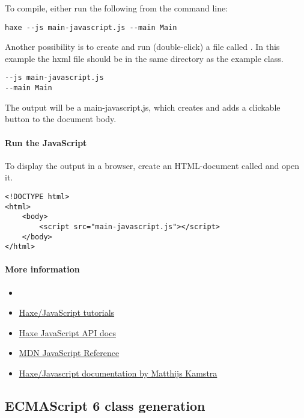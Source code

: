 To compile, either run the following from the command line:

\begin{lstlisting}
haxe --js main-javascript.js --main Main
\end{lstlisting}

Another possibility is to create and run (double-click) a file called . In this example the hxml file should be in the same directory as the example class.

\begin{lstlisting}
--js main-javascript.js
--main Main
\end{lstlisting}

The output will be a main-javascript.js, which creates and adds a clickable button to the document body.

\paragraph{Run the JavaScript}

To display the output in a browser, create an HTML-document called  and open it.

\begin{lstlisting}
<!DOCTYPE html>
<html>
	<body>
		<script src="main-javascript.js"></script>
	</body>
</html>
\end{lstlisting}

\paragraph{More information}

\begin{itemize}
	\item {}
	\item \href{https://code.haxe.org/category/javascript/}{Haxe/JavaScript tutorials}
	\item \href{https://api.haxe.org/js/}{Haxe JavaScript API docs}
	\item \href{https://developer.mozilla.org/bm/docs/Web/JavaScript}{MDN JavaScript Reference}
	\item \href{https://matthijskamstra.github.io/haxejs/}{Haxe/Javascript documentation by Matthijs Kamstra}
\end{itemize}

\subsection{ECMAScript 6 class generation}
\label{target-javascript-es6}

